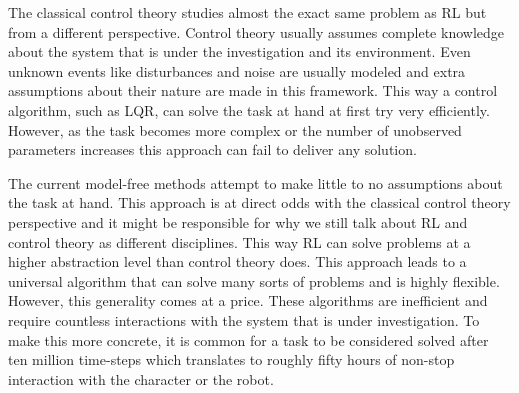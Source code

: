 




The classical control theory studies almost the exact same problem as \ac{RL} but from a different perspective. Control theory usually assumes complete knowledge about the system that is under the investigation and its environment. Even unknown events like disturbances and noise are usually modeled and extra assumptions about their nature are made in this framework. This way a control algorithm, such as LQR, can solve the task at hand at first try very efficiently. However, as the task becomes more complex or the number of unobserved parameters increases this approach can fail to deliver any solution.

The current model-free methods attempt to make little to no assumptions about the task at hand. This approach is at direct odds with the classical control theory perspective and it might be responsible for why we still talk about \ac{RL} and control theory as different disciplines. This way \ac{RL} can solve problems at a higher abstraction level than control theory does. This approach leads to a universal algorithm that can solve many sorts of problems and is highly flexible. However, this generality comes at a price. These algorithms are inefficient  and require countless interactions with the system that is under investigation. To make this more concrete, it is common for a task to be considered solved after ten million time-steps which translates to roughly fifty hours of non-stop interaction with the character or the robot.

